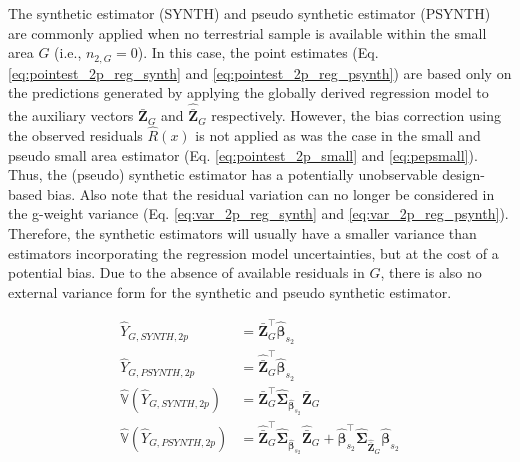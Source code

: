 \documentclass[article]{jss}
\newcommand{\var}{\mathbb{V}}
\begin{document}
The synthetic estimator (SYNTH) and pseudo synthetic estimator (PSYNTH) are commonly applied when no terrestrial sample is available within the small area $G$ (i.e., $n_{2,G}=0$). In this case, the point estimates (Eq. \ref{eq:pointest_2p_reg_synth} and \ref{eq:pointest_2p_reg_psynth}) are based only on the predictions generated by applying the globally derived regression model to the auxiliary vectors $\bar{\pmb{Z}}_G$ and $\hat{\bar{\pmb{Z}}}_G$ respectively. However, the bias correction using the observed residuals $\hat{R}(x)$ is not applied as was the case in the small and pseudo small area estimator (Eq. \ref{eq:pointest_2p_small} and \ref{eq:pepsmall}). Thus, the (pseudo) synthetic estimator has a potentially unobservable design-based bias. Also note that the residual variation can no longer be considered in the g-weight variance (Eq. \ref{eq:var_2p_reg_synth} and \ref{eq:var_2p_reg_psynth}). Therefore, the synthetic estimators will usually have a smaller variance than estimators incorporating the regression model uncertainties, but at the cost of a potential bias. Due to the absence of available residuals in $G$, there is also no external variance form for the synthetic and pseudo synthetic estimator.


\begin{subequations}\label{eq:pest_2p_synth_psynth}
\begin{align}
  \hat{Y}_{G,SYNTH,2p} & =\bar{\pmb{Z}}_G^{\top}\hat{\pmb{\beta}}_{s_2} \label{eq:pointest_2p_reg_synth} \\
  \hat{Y}_{G,PSYNTH,2p} & =\hat{\bar{\pmb{Z}}}_G^{\top}\hat{\pmb{\beta}}_{s_2} \label{eq:pointest_2p_reg_psynth} \\
  \hat{\var}(\hat{Y}_{G,SYNTH,2p}) & = \bar{\pmb{Z}}_G^{\top}\hat{\pmb{\Sigma}}_{\hat{\pmb{\beta}}_{s_2}}\bar{\pmb{Z}}_G \label{eq:var_2p_reg_synth} \\
  \hat{\var}(\hat{Y}_{G,PSYNTH,2p}) & = \hat{\bar{\pmb{Z}}}_G^{\top}\hat{\pmb{\Sigma}}_{\hat{\pmb{\beta}}_{s_2}}\hat{\bar{\pmb{Z}}}_G
  + \hat{\pmb{\beta}}_{s_2}^{\top}\hat{\pmb{\Sigma}}_{\hat{\bar{\pmb{Z}}}_G}\hat{\pmb{\beta}}_{s_2}  \label{eq:var_2p_reg_psynth}
\end{align}
\end{subequations}
\end{document}
